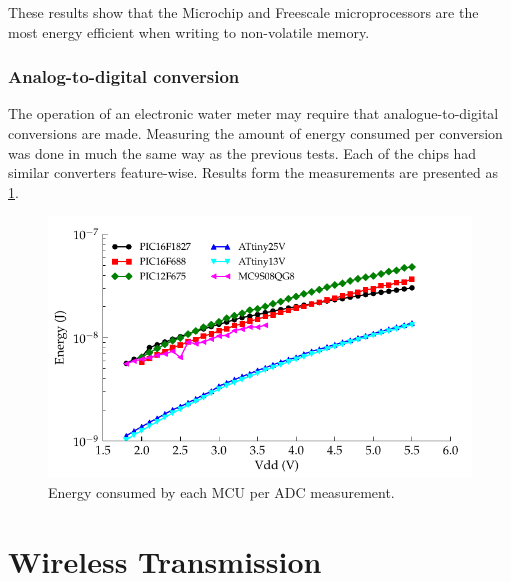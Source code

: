      These results show that the Microchip and Freescale microprocessors are the most energy efficient when writing to non-volatile memory.



    \subsubsection{Analog-to-digital conversion}

      The operation of an electronic water meter may require that analogue-to-digital conversions are made.
      Measuring the amount of energy consumed per conversion was done in much the same way as the previous tests.
      Each of the chips had similar converters feature-wise.
      Results form the measurements are presented as \cref{fig:Energy-consumed-ADC}.

      \begin{figure}
        \centering
        \includegraphics{content/pt1/03-EnergyRequirements/graphics/Graph_ALL_ADC_JPM}
        \caption{\label{fig:Energy-consumed-ADC}Energy consumed by each MCU per ADC measurement.}
      \end{figure}


  \section{Wireless Transmission}

